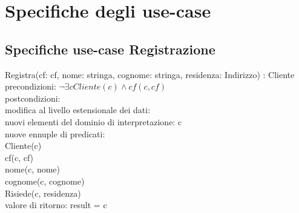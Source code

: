 \documentclass[a4paper,12pt]{report}
\begin{document}
    \chapter{Specifiche degli use-case}
      \section{Specifiche use-case Registrazione}
        \hspace*{1cm}Registra(cf: cf, nome: stringa, cognome: stringa, residenza: Indirizzo) : Cliente \\
        \hspace*{2cm}precondizioni: $\neg \exists c Cliente(c) \wedge cf(c, cf)$ \\
        \hspace*{2cm}postcondizioni: \\
        \hspace*{3cm}modifica al livello estensionale dei dati: \\
        \hspace*{4cm}nuovi elementi del dominio di interpretazione: c \\
        \hspace*{4cm}nuove ennuple di predicati: \\
        \hspace*{5cm}Cliente(c) \\
        \hspace*{5cm}cf(c, cf) \\
        \hspace*{5cm}nome(c, nome) \\
        \hspace*{5cm}cognome(c, cognome) \\
        \hspace*{5cm}Risiede(c, residenza) \\
        \hspace*{3cm}valore di ritorno: result = c \\ \\
\end{document}

